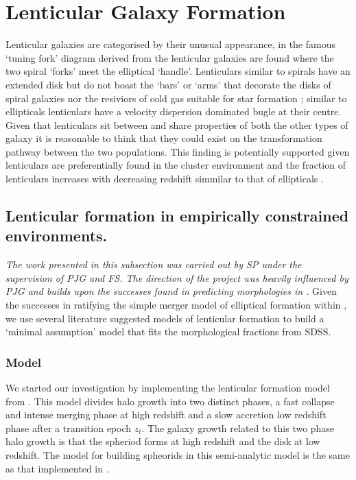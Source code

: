 \section{Lenticular Galaxy Formation}
Lenticular galaxies are categorised by their unusual appearance, in the famous `tuning fork' diagram derived from \citet{Hubble1927TheNebulae} the lenticular galaxies are found where the two spiral `forks' meet the elliptical `handle'. Lenticulars similar to spirals have an extended disk but do not boast the `bars' or `arms' that decorate the disks of spiral galaxies nor the resiviors of cold gas suitable for star formation \cite{CHAMARAUX1986TheSamples}; similar to ellipticals lenticulars have a velocity dispersion dominated bugle at their centre. 
Given that lenticulars sit between and share properties of both the other types of galaxy it is reasonable to think that they could exist on the transformation pathway between the two populations. This finding is potentially supported given lenticulars are preferentially found in the cluster environment \cite{Dressler1980GalaxyGalaxies} and the fraction of lenticulars increases with decreasing redshift simmilar to that of ellipticals \cite{Postman2005TheClusters}. 
\subsection{Lenticular formation in empirically constrained environments.}
\textit{The work presented in this subsection was carried out by SP under the supervision of PJG and FS. The direction of the project was heavily influenced by PJG and builds upon the successes found in predicting morphologies in \steel.}
Given the successes in ratifying the simple merger model of elliptical formation within \steel, we use several literature suggested models of lenticular formation to build a `minimal assumption' model that fits the morphological fractions from SDSS.

\subsubsection{\citet{Cook2009Two-phaseFormation} Model}

We started our investigation by implementing the lenticular formation model from \citet{Cook2009Two-phaseFormation}. This model divides halo growth into two distinct phases, a fast collapse and intense merging phase at high redshift and a slow accretion low redshift phase after a transition epoch $z_{t}$. The galaxy growth related to this two phase halo growth is that the spheriod forms at high redshift and the disk at low redshift. The model for building spheorids in this semi-analytic model is the same as that implemented in \citet{Granato2004AHosts}. 

